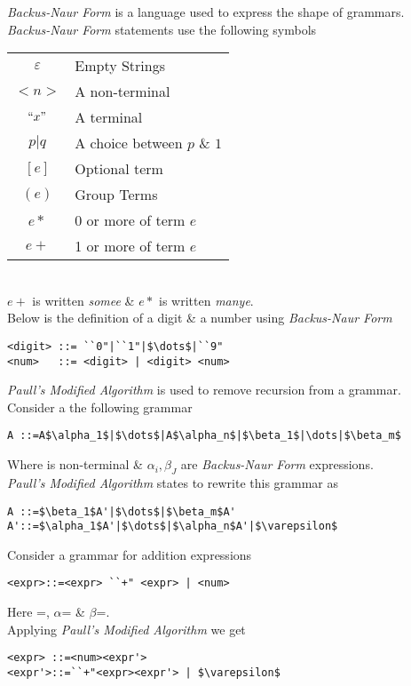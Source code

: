 \documentclass[11pt,a4paper]{article}
\begin{document}
\textit{Backus-Naur Form} is a language used to express the shape of grammars.\\
\textit{Backus-Naur Form} statements use the following symbols\\
\begin{tabular}{c|l}
$\varepsilon$&Empty Strings\\
$<n>$&A non-terminal\\
$``x"$&A terminal\\
$p|q$&A choice between $p$ \& $1$\\
$[e]$&Optional term\\
$(e)$&Group Terms\\
$e*$&0 or more of term $e$\\
$e+$&1 or more of term $e$
\end{tabular}\\
\NB $e+$ is written \textit{somee} \& $e*$ is written \textit{manye}.\\

Below is the definition of a digit \& a number using \textit{Backus-Naur Form}
\begin{lstlisting}
<digit> ::= ``0"|``1"|$\dots$|``9"
<num>   ::= <digit> | <digit> <num>
\end{lstlisting}

\textit{Paull's Modified Algorithm} is used to remove recursion from a grammar.\\
Consider a the following grammar
\begin{lstlisting}
A ::=A$\alpha_1$|$\dots$|A$\alpha_n$|$\beta_1$|\dots|$\beta_m$
\end{lstlisting}
Where {} is non-terminal \& $\alpha_i,\beta_J$ are \textit{Backus-Naur Form} expressions.\\
\textit{Paull's Modified Algorithm} states to rewrite this grammar as
\begin{lstlisting}
A ::=$\beta_1$A'|$\dots$|$\beta_m$A'
A'::=$\alpha_1$A'|$\dots$|$\alpha_n$A'|$\varepsilon$
\end{lstlisting}

Consider a grammar for addition expressions
\begin{lstlisting}
<expr>::=<expr> ``+" <expr> | <num>
\end{lstlisting}
Here {}={}, $\alpha$={} \& $\beta$={}.\\
Applying \textit{Paull's Modified Algorithm} we get
\begin{lstlisting}
<expr> ::=<num><expr'>
<expr'>::=``+"<expr><expr'> | $\varepsilon$
\end{lstlisting}
\end{document}
